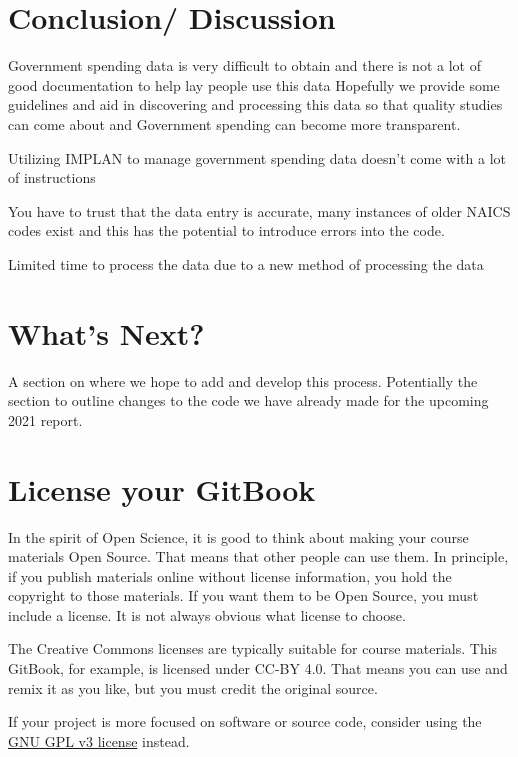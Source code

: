 \documentclass[
]{book}
\begin{document}
\hypertarget{conclusion-discussion}{%
\chapter{Conclusion/ Discussion}\label{conclusion-discussion}}

Government spending data is very difficult to obtain and there is not a lot of good documentation to help lay people use this data
Hopefully we provide some guidelines and aid in discovering and processing this data so that quality studies can come about and
Government spending can become more transparent.

Utilizing IMPLAN to manage government spending data doesn't come with a lot of instructions

You have to trust that the data entry is accurate, many instances of older NAICS codes exist and this has the potential to introduce errors into the code.

Limited time to process the data due to a new method of processing the data

\hypertarget{whats-next}{%
\chapter{What's Next?}\label{whats-next}}

A section on where we hope to add and develop this process. Potentially the section to outline changes to the code we have already made for the upcoming 2021 report.

\hypertarget{license-your-gitbook}{%
\chapter{License your GitBook}\label{license-your-gitbook}}

In the spirit of Open Science, it is good to think about making your course materials Open Source. That means that other people can use them. In principle, if you publish materials online without license information, you hold the copyright to those materials. If you want them to be Open Source, you must include a license. It is not always obvious what license to choose.

The Creative Commons licenses are typically suitable for course materials. This GitBook, for example, is licensed under CC-BY 4.0. That means you can use and remix it as you like, but you must credit the original source.

If your project is more focused on software or source code, consider using the \href{https://www.gnu.org/licenses/gpl-3.0.en.html}{GNU GPL v3 license} instead.
\end{document}
